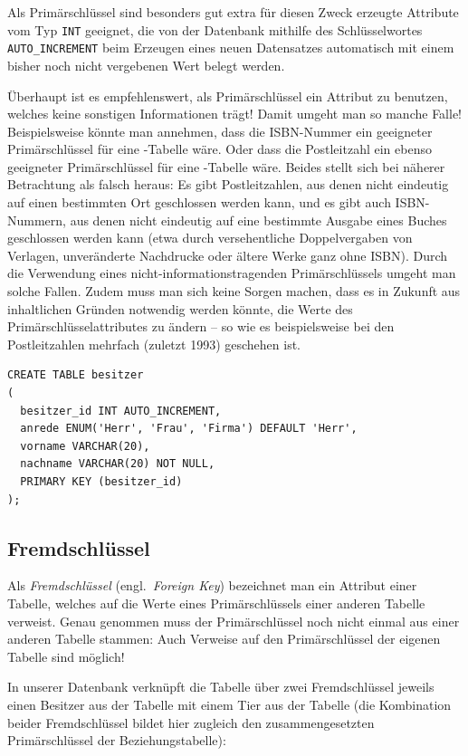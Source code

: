 Als Primärschlüssel sind besonders gut extra für diesen Zweck erzeugte
Attribute vom Typ \lstinline|INT| geeignet, die von der Datenbank mithilfe des
Schlüsselwortes \lstinline|AUTO_INCREMENT| beim Erzeugen eines neuen
Datensatzes automatisch mit einem bisher noch nicht vergebenen Wert belegt
werden.

Überhaupt ist es empfehlenswert, als Primärschlüssel ein Attribut zu benutzen,
welches keine sonstigen Informationen trägt! Damit umgeht man so manche Falle!
Beispielsweise könnte man annehmen, dass die ISBN-Nummer ein geeigneter
Primärschlüssel für eine -Tabelle wäre. Oder dass die
Postleitzahl ein ebenso geeigneter Primärschlüssel für eine
-Tabelle wäre. Beides stellt sich bei näherer Betrachtung als
falsch heraus: Es gibt Postleitzahlen, aus denen nicht eindeutig auf einen
bestimmten Ort geschlossen werden kann, und es gibt auch ISBN-Nummern, aus
denen nicht eindeutig auf eine bestimmte Ausgabe eines Buches geschlossen werden
kann (etwa durch versehentliche Doppelvergaben von Verlagen, unveränderte
Nachdrucke oder ältere Werke ganz ohne ISBN). Durch die Verwendung eines
nicht-informationstragenden Primärschlüssels umgeht man solche Fallen. Zudem
muss man sich keine Sorgen machen, dass es in Zukunft aus inhaltlichen Gründen
notwendig werden könnte, die Werte des Primärschlüsselattributes zu ändern --
so wie es beispielsweise bei den Postleitzahlen mehrfach (zuletzt 1993)
geschehen ist.

\begin{lstlisting}
CREATE TABLE besitzer
(
  besitzer_id INT AUTO_INCREMENT,
  anrede ENUM('Herr', 'Frau', 'Firma') DEFAULT 'Herr',
  vorname VARCHAR(20),
  nachname VARCHAR(20) NOT NULL,
  PRIMARY KEY (besitzer_id)
);
\end{lstlisting}

\subsection{Fremdschlüssel}

Als \emph{Fremdschlüssel} (engl.\ \emph{Foreign Key}) bezeichnet man ein
Attribut einer Tabelle, welches auf die Werte eines Primärschlüssels einer
anderen Tabelle verweist. Genau genommen muss der Primärschlüssel noch nicht
einmal aus einer anderen Tabelle stammen: Auch Verweise auf den Primärschlüssel
der eigenen Tabelle sind möglich!

In unserer Datenbank  verknüpft die Tabelle
 über zwei Fremdschlüssel jeweils einen Besitzer aus der
Tabelle  mit einem Tier aus der Tabelle
 (die Kombination beider Fremdschlüssel bildet hier zugleich
den zusammengesetzten Primärschlüssel der Beziehungstabelle):

